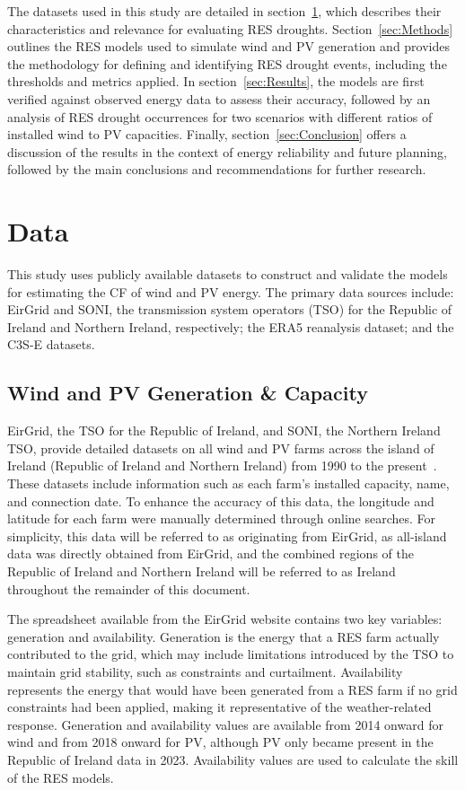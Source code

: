 \documentclass[a4paper, 11p1t]{article}
\begin{document}
The datasets used in this study are detailed in section~\ref{sec:Data}, which describes their characteristics and relevance for evaluating RES droughts. Section~\ref{sec:Methods} outlines the RES models used to simulate wind and PV generation and provides the methodology for defining and identifying RES drought events, including the thresholds and metrics applied. In section~\ref{sec:Results}, the models are first verified against observed energy data to assess their accuracy, followed by an analysis of RES drought occurrences for two scenarios with different ratios of installed wind to PV capacities. Finally, section~\ref{sec:Conclusion} offers a discussion of the results in the context of energy reliability and future planning, followed by the main conclusions and recommendations for further research.

\section{Data}
\label{sec:Data}

This study uses publicly available datasets to construct and validate the models for estimating the CF of wind and PV energy. The primary data sources include: EirGrid and SONI, the transmission system operators (TSO) for the Republic of Ireland and Northern Ireland, respectively; the ERA5 reanalysis dataset; and the C3S-E datasets.

\subsection{Wind and PV Generation \& Capacity}
\label{sec:eirgrid}

EirGrid, the TSO for the Republic of Ireland, and SONI, the Northern Ireland TSO, provide detailed datasets on all wind and PV farms across the island of Ireland (Republic of Ireland and Northern Ireland) from 1990 to the present~\cite{eirgrid2023spreadsheet}. These datasets include information such as each farm’s installed capacity, name, and connection date. To enhance the accuracy of this data, the longitude and latitude for each farm were manually determined through online searches. For simplicity, this data will be referred to as originating from EirGrid, as all-island data was directly obtained from EirGrid, and the combined regions of the Republic of Ireland and Northern Ireland will be referred to as Ireland throughout the remainder of this document.

The spreadsheet available from the EirGrid website contains two key variables: generation and availability. Generation is the energy that a RES farm actually contributed to the grid, which may include limitations introduced by the TSO to maintain grid stability, such as constraints and curtailment. Availability represents the energy that would have been generated from a RES farm if no grid constraints had been applied, making it representative of the weather-related response. Generation and availability values are available from 2014 onward for wind and from 2018 onward for PV, although PV only became present in the Republic of Ireland data in 2023. Availability values are used to calculate the skill of the RES models. 
\end{document}
